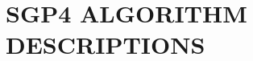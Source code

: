 \documentclass{article}
\begin{document}
\section{SGP4 ALGORITHM DESCRIPTIONS}
\label{sec:algorithms}







\end{document}
